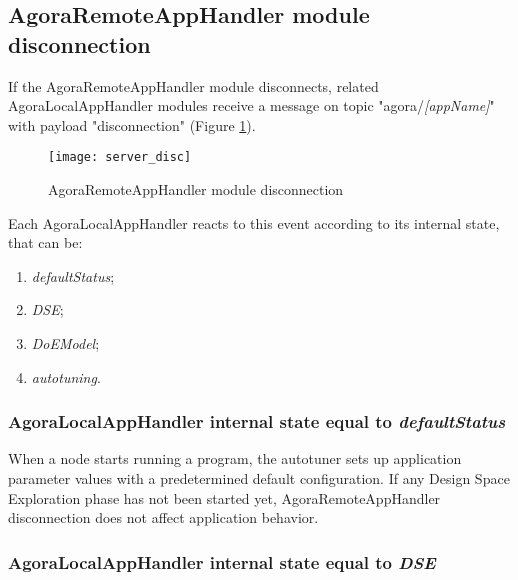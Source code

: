 \subsection{AgoraRemoteAppHandler module disconnection}\label{handler_disc}

If the AgoraRemoteAppHandler module disconnects, related AgoraLocalAppHandler modules receive a message on topic "agora\slash{}\textit{[appName]}" with payload "disconnection" (Figure \ref{fig::remDisc}).

\begin{figure}[htb]

    \centering
    \texttt{[image: server\_disc]}
    \caption{AgoraRemoteAppHandler module disconnection}

    \label{fig::remDisc}
    
\end{figure}

Each AgoraLocalAppHandler reacts to this event according to its internal state, that can be:

\begin{enumerate}

    \item \textit{defaultStatus};
    
    \item \textit{DSE};
    
    \item \textit{DoEModel};
    
    \item \textit{autotuning}.

\end{enumerate}


\subsubsection{AgoraLocalAppHandler internal state equal to \textit{defaultStatus}}

When a node starts running a program, the autotuner sets up application parameter values with a predetermined default configuration. If any Design Space Exploration phase has not been started yet, AgoraRemoteAppHandler disconnection does not affect application behavior.


\subsubsection{AgoraLocalAppHandler internal state equal to \textit{DSE}}

